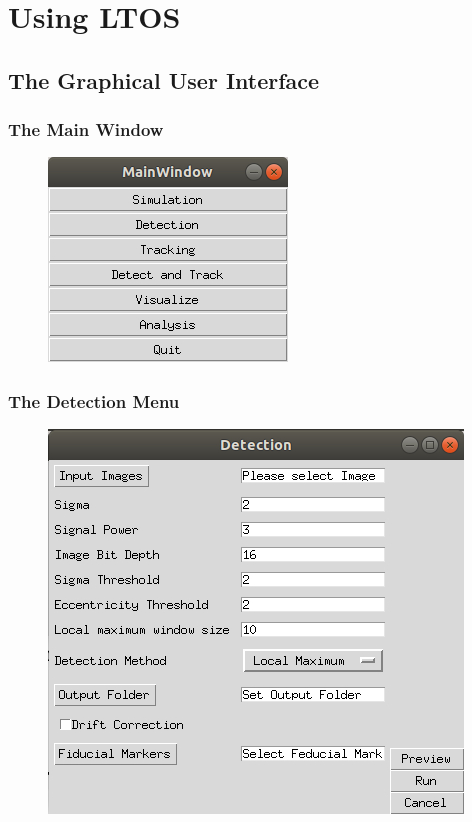 \documentclass[oneside,letterpaper]{scrartcl}
\newcommand{\PN}{LTOS}
\begin{document}
\section{Using \PN}\parindent 0pt

\subsection{The Graphical User Interface}

\subsubsection{The Main Window}
\begin{figure}
\includegraphics[scale=1.]{Figures/MainGUI.jpg}
\end{figure}
\subsubsection{The Detection Menu}
\begin{figure}
\includegraphics[scale=1.]{Figures/DetectionGUI.jpg}
\end{figure}
\end{document}
